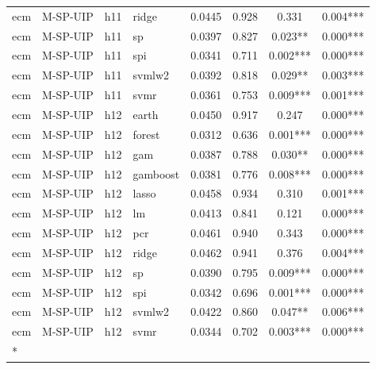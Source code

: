 \begin{ThreePartTable}
\begin{longtable}[t]{llclcccc}
ecm & M-SP-UIP & h11 & ridge & 0.0445 & 0.928 & 0.331 & 0.004***\\
ecm & M-SP-UIP & h11 & sp & 0.0397 & 0.827 & 0.023** & 0.000***\\
ecm & M-SP-UIP & h11 & spi & 0.0341 & 0.711 & 0.002*** & 0.000***\\
ecm & M-SP-UIP & h11 & svmlw2 & 0.0392 & 0.818 & 0.029** & 0.003***\\
ecm & M-SP-UIP & h11 & svmr & 0.0361 & 0.753 & 0.009*** & 0.001***\\
\addlinespace
ecm & M-SP-UIP & h12 & earth & 0.0450 & 0.917 & 0.247 & 0.000***\\
ecm & M-SP-UIP & h12 & forest & 0.0312 & 0.636 & 0.001*** & 0.000***\\
ecm & M-SP-UIP & h12 & gam & 0.0387 & 0.788 & 0.030** & 0.000***\\
ecm & M-SP-UIP & h12 & gamboost & 0.0381 & 0.776 & 0.008*** & 0.000***\\
ecm & M-SP-UIP & h12 & lasso & 0.0458 & 0.934 & 0.310 & 0.001***\\
ecm & M-SP-UIP & h12 & lm & 0.0413 & 0.841 & 0.121 & 0.000***\\
ecm & M-SP-UIP & h12 & pcr & 0.0461 & 0.940 & 0.343 & 0.000***\\
ecm & M-SP-UIP & h12 & ridge & 0.0462 & 0.941 & 0.376 & 0.004***\\
ecm & M-SP-UIP & h12 & sp & 0.0390 & 0.795 & 0.009*** & 0.000***\\
ecm & M-SP-UIP & h12 & spi & 0.0342 & 0.696 & 0.001*** & 0.000***\\
ecm & M-SP-UIP & h12 & svmlw2 & 0.0422 & 0.860 & 0.047** & 0.006***\\
ecm & M-SP-UIP & h12 & svmr & 0.0344 & 0.702 & 0.003*** & 0.000***\\*
\end{longtable}
\end{ThreePartTable}
\endgroup{}
